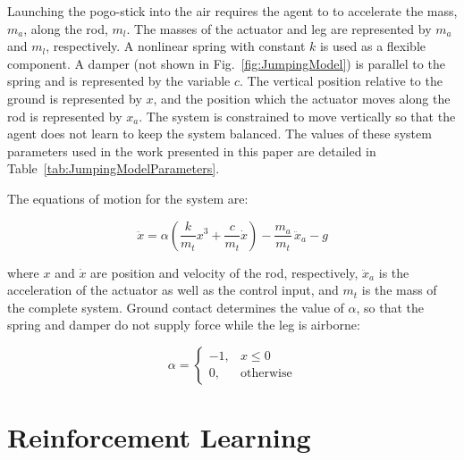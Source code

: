 \documentclass{ifacconf}
\begin{document}
      Launching the pogo-stick into the air requires the agent to to accelerate the mass, $m_a$, along the rod, $m_l$. The masses of the actuator and leg are represented by $m_a$ and $m_l$, respectively. A nonlinear spring with constant $k$ is used as a flexible component. A damper (not shown in Fig.~\ref{fig:JumpingModel}) is parallel to the spring and is represented by the variable $c$. The vertical position relative to the ground is represented by $x$, and the position which the actuator moves along the rod is represented by $x_a$. The system is constrained to move vertically so that the agent does not learn to keep the system balanced. The values of these system parameters used in the work presented in this paper are detailed in Table~\ref{tab:JumpingModelParameters}.

      The equations of motion for the system are:

      \begin{equation}
         \ddot{x} = \alpha \left(\frac{k}{m_t}x^3+\frac{c}{m_t}\dot{x}\right)-\frac{m_a}{m_t}\,\ddot{x}_a-g
      \end{equation}

      where $x$ and $\dot{x}$ are position and velocity of the rod, respectively, $\ddot{x}_a$ is the acceleration of the actuator as well as the control input, and $m_t$ is the mass of the complete system. Ground contact determines the value of $\alpha$, so that the spring and damper do not supply force while the leg is airborne:

      \begin{equation}
         \alpha =
         \left\{\begin{matrix}
            -1, & x \leq 0\\ 
            0, & \mbox{otherwise}
            \end{matrix}\right.
      \end{equation}
      

\section{Reinforcement Learning}
\end{document}
